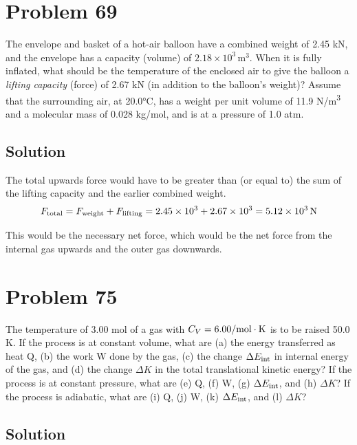 \documentclass[12pt]{article}
\newcommand{\E}[1]{\times 10^{#1}}
\begin{document}
    \pagebreak
    \section{Problem 69}
        The envelope and basket of a hot-air balloon have a combined weight of 2.45 kN, and the envelope has a capacity (volume) of $2.18\E{3}\,\unit{\meter^3}$. 
        When it is fully inflated, what should be the temperature of the enclosed air to give the balloon a \textit{lifting capacity} (force) of 2.67 kN (in addition to the balloon's weight)?
        Assume that the surrounding air, at 20.0°C, has a weight per unit volume of 11.9 \unit{\newton/\meter^3} and a molecular mass of 0.028 kg/mol, and is at a pressure of 1.0 atm.

        \subsection{Solution}
            The total upwards force would have to be greater than (or equal to) the sum of the lifting capacity and the earlier combined weight.
            \begin{equation}
                F_{\rm total}   =   F_{\rm weight} + F_{\rm lifting}
                    =   2.45\E{3} + 2.67\E{3}
                    =   5.12\E{3}\,\unit{\newton}
            \end{equation}

            This would be the necessary net force, which would be the net force from the internal gas upwards and the outer gas downwards.

    \pagebreak
    \section{Problem 75}
        The temperature of 3.00 mol of a gas with $C_V = 6.00 \unit{\cal/\mole\cdot\kelvin}$ is to be raised 50.0 K. 
        If the process is at constant volume, what are (a) the energy transferred as heat Q, (b) the work W done by the gas, (c) the change $\Delta E_{\rm int}$ in internal energy of the gas, and (d) the change $\Delta K$ in the total translational kinetic energy? 
        If the process is at constant pressure, what are (e) Q, (f) W, (g) $\Delta E_{\rm int}$, and (h) $\Delta K$? 
        If the process is adiabatic, what are (i) Q, (j) W, (k) $\Delta E_{\rm int}$, and (l) $\Delta K$?

        \subsection{Solution}
\end{document}
